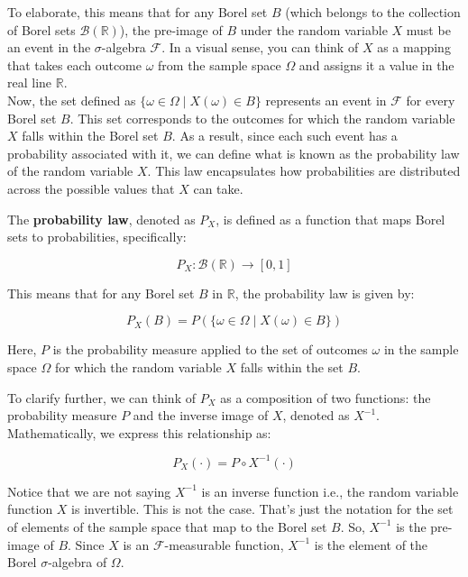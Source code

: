 To elaborate, this means that for any Borel set \(B\) (which belongs to the collection of Borel sets \(\mathcal{B}(\mathbb{R})\)), the pre-image of \(B\) under the random variable \(X\) must be an event in the \(\sigma\)-algebra \(\mathcal{F}\). In a visual sense, you can think of \(X\) as a mapping that takes each outcome \(\omega\) from the sample space \(\Omega\) and assigns it a value in the real line \(\mathbb{R}\).\\

Now, the set defined as \(\{ \omega \in \Omega \mid X(\omega) \in B \}\) represents an event in \(\mathcal{F}\) for every Borel set \(B\). This set corresponds to the outcomes for which the random variable \(X\) falls within the Borel set \(B\). As a result, since each such event has a probability associated with it, we can define what is known as the probability law of the random variable \(X\). This law encapsulates how probabilities are distributed across the possible values that \(X\) can take.\\

\begin{definition}
The \textbf{probability law}, denoted as \( P_X \), is defined as a function that maps Borel sets to probabilities, specifically:

\[
P_X : \mathcal{B}(\mathbb{R}) \to [0, 1]
\]

This means that for any Borel set \( B \) in \( \mathbb{R} \), the probability law is given by:

\[
P_X(B) = P(\{ \omega \in \Omega \mid X(\omega) \in B \})
\]

Here, \( P \) is the probability measure applied to the set of outcomes \( \omega \) in the sample space \( \Omega \) for which the random variable \( X \) falls within the set \( B \). 
\end{definition}

To clarify further, we can think of \( P_X \) as a composition of two functions: the probability measure \( P \) and the inverse image of \( X \), denoted as \( X^{-1} \). Mathematically, we express this relationship as:

\[
P_X(\cdot) = P \circ X^{-1}(\cdot)
\]

\vspace{10pt}
Notice that we are not saying $X^{-1}$ is an inverse function i.e., the random variable function $X$ is invertible. This is not the case. That's just the notation for the set of elements of the sample space that map to the Borel set $B$. So, $X^{-1}$ is the pre-image of $B$. Since $X$ is an $\mathcal{F}$-measurable function, $X^{-1}$ is the element of the $\text{Borel }\sigma$-algebra of $\Omega$.\\  

